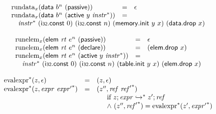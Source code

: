 \vspace{1ex}

$$
\begin{array}[t]{@{}lcl@{}l@{}}
{{\mathrm{rundata}}}_{x}(\mathsf{data}~{b^{n}}~(\mathsf{passive})) & = & \epsilon \\
{{\mathrm{rundata}}}_{x}(\mathsf{data}~{b^{n}}~(\mathsf{active}~y~{{\mathit{instr}}^\ast})) & = & & \\
 \multicolumn{4}{@{}l@{}}{\quad
\begin{array}[t]{@{}l@{}}
{{\mathit{instr}}^\ast}~(\mathsf{i{\scriptstyle 32}}{.}\mathsf{const}~0)~(\mathsf{i{\scriptstyle 32}}{.}\mathsf{const}~n)~(\mathsf{memory{.}init}~y~x)~(\mathsf{data{.}drop}~x) \\
\end{array}
} \\
\end{array}
$$

$$
\begin{array}[t]{@{}lcl@{}l@{}}
{{\mathrm{runelem}}}_{x}(\mathsf{elem}~{\mathit{rt}}~{e^{n}}~(\mathsf{passive})) & = & \epsilon \\
{{\mathrm{runelem}}}_{x}(\mathsf{elem}~{\mathit{rt}}~{e^{n}}~(\mathsf{declare})) & = & (\mathsf{elem{.}drop}~x) \\
{{\mathrm{runelem}}}_{x}(\mathsf{elem}~{\mathit{rt}}~{e^{n}}~(\mathsf{active}~y~{{\mathit{instr}}^\ast})) & = & & \\
 \multicolumn{4}{@{}l@{}}{\quad
\begin{array}[t]{@{}l@{}}
{{\mathit{instr}}^\ast}~(\mathsf{i{\scriptstyle 32}}{.}\mathsf{const}~0)~(\mathsf{i{\scriptstyle 32}}{.}\mathsf{const}~n)~(\mathsf{table{.}init}~y~x)~(\mathsf{elem{.}drop}~x) \\
\end{array}
} \\
\end{array}
$$

$$
\begin{array}[t]{@{}lcl@{}l@{}}
{{{\mathrm{evalexpr}}^\ast}}{(z, \epsilon)} & = & (z, \epsilon) \\
{{{\mathrm{evalexpr}}^\ast}}{(z, {\mathit{expr}}~{{\mathit{expr}'}^\ast})} & = & ({z''}, {\mathit{ref}}~{{\mathit{ref}'}^\ast}) &  \\
&& \multicolumn{2}{@{}l@{}}{\quad
\quad
\begin{array}[t]{@{}l@{}}
\mbox{if}~ z ; {\mathit{expr}} \hookrightarrow^\ast {z'} ; {\mathit{ref}} \\
{\land}~ ({z''}, {{\mathit{ref}'}^\ast}) = {{{\mathrm{evalexpr}}^\ast}}{({z'}, {{\mathit{expr}'}^\ast})} \\
\end{array}
} \\
\end{array}
$$

